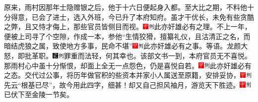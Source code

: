原来，雨村因那年士隐赠银之后，他于十六日便起身入都。至大比之期，不料他十分得意，已会了进士，选入外班，今已升了本府知府。虽才干优长，未免有些贪酷之弊，且又恃才侮上，那些官员皆侧目而视。{\includegraphics[width=3mm]{../Images/00002}\includegraphics[width=3mm]{../Images/00011}\footnotesize \kaishu 此亦奸雄必有之理。}不上一年，便被上司寻了个空隙，作成一本，参他``生情狡猾，擅纂礼仪，且沽清正之名，而暗结虎狼之属，致使地方多事，民命不堪''{\includegraphics[width=3mm]{../Images/00002}\includegraphics[width=3mm]{../Images/00011}\footnotesize \kaishu 此亦奸雄必有之事。}等语。龙颜大怒，即批革职。{\includegraphics[width=3mm]{../Images/00006}\includegraphics[width=3mm]{../Images/00011}\footnotesize \kaishu 罪重而法轻，何其幸也。}该部文书一到，本府官员无不喜悦。那雨村心中虽十分惭恨，却面上全无一点怨色，仍是喜悦自若。{\includegraphics[width=3mm]{../Images/00002}\includegraphics[width=3mm]{../Images/00011}\footnotesize \kaishu 此亦奸雄必有之态。}交代过公事，将历年做官积的些资本并家小人属送至原籍，安排妥协，{\includegraphics[width=3mm]{../Images/00002}\includegraphics[width=3mm]{../Images/00011}\footnotesize \kaishu 先云``根基已尽''，故今用此四字，细甚！}却又自己担风袖月，游览天下胜迹。{\includegraphics[width=3mm]{../Images/00002}\includegraphics[width=3mm]{../Images/00011}\footnotesize \kaishu 已伏下至金陵一节矣。}


